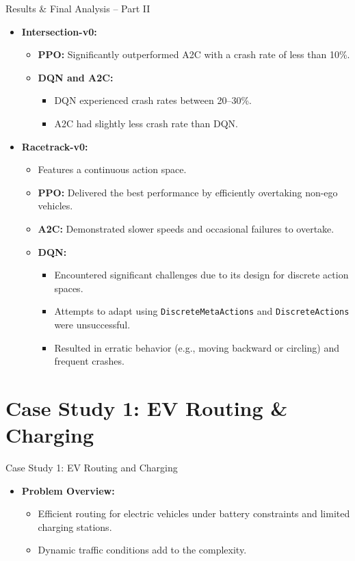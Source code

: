 \documentclass{beamer}
\begin{document}
\begin{frame}{Results \& Final Analysis -- Part II}
    \begin{itemize}
         \item \textbf{Intersection-v0:}
    \begin{itemize}[<+->]
      \item \textbf{PPO:} Significantly outperformed A2C with a crash rate of less than 10\%.
      \item \textbf{DQN and A2C:}
        \begin{itemize}[<+->]
          \item DQN experienced crash rates between 20--30\%.
          \item A2C had slightly less crash rate than DQN.
        \end{itemize}
    \end{itemize}
  \item \textbf{Racetrack-v0:}
    \begin{itemize}[<+->]
      \item Features a continuous action space.
      \item \textbf{PPO:} Delivered the best performance by efficiently overtaking non-ego vehicles.
      \item \textbf{A2C:} Demonstrated slower speeds and occasional failures to overtake.
      \item \textbf{DQN:}
        \begin{itemize}[<+->]
          \item Encountered significant challenges due to its design for discrete action spaces.
          \item Attempts to adapt using \texttt{DiscreteMetaActions} and \texttt{DiscreteActions} were unsuccessful.
          \item Resulted in erratic behavior (e.g., moving backward or circling) and frequent crashes.
        \end{itemize}
    \end{itemize}
\end{itemize}
\end{frame}

\section{Case Study 1: EV Routing \& Charging}
\begin{frame}{Case Study 1: EV Routing and Charging}
  \begin{itemize}[<+->]
    \item \textbf{Problem Overview:}
      \begin{itemize}[<+->]
        \item Efficient routing for electric vehicles under battery constraints and limited charging stations.
        \item Dynamic traffic conditions add to the complexity.
      \end{itemize}
  \end{itemize}
\end{frame}
\end{document}
